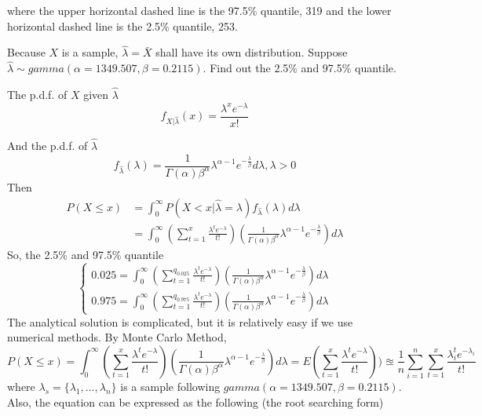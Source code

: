 \documentclass[12pt]{article}
\begin{document}
where the upper horizontal dashed line is the 97.5\% quantile, 319 and
the lower horizontal dashed line is the 2.5\% quantile, 253.

Because \(X\) is a sample, \(\hat{\lambda} = \bar{X}\) shall have its
own distribution. Suppose
\(\hat{\lambda} \sim gamma(\alpha= 1349.507, \beta = 0.2115)\). Find out
the 2.5\% and 97.5\% quantile.

\par

The p.d.f. of \(X\) given \(\hat{\lambda}\) \begin{equation*}
            f_{X|\hat{\lambda}}(x) = \frac{\lambda^{x}e^{-\lambda}}{x!}
    \end{equation*}

\par

And the p.d.f. of \(\hat{\lambda}\) \begin{equation*}
        f_{\hat{\lambda}}(\lambda) = \frac{1}{\Gamma(\alpha)\beta^{\alpha}}\lambda^{\alpha - 1}e^{-\frac{\lambda}{\beta}}d\lambda, \lambda > 0
    \end{equation*} Then \begin{equation*}
        \begin{split}
            P(X \le x) &= \int_{0}^{\infty}P(X < x | \hat{\lambda} = \lambda)f_{\hat{\lambda}}(\lambda) d \lambda \\
            & = \int_{0}^{\infty}(\sum_{t = 1}^{x}\frac{\lambda^{t}e^{-\lambda}}{t!})(\frac{1}{\Gamma(\alpha)\beta^{\alpha}}\lambda^{\alpha - 1}e^{-\frac{\lambda}{\beta}}) d \lambda
        \end{split}
    \end{equation*} So, the 2.5\% and 97.5\% quantile \begin{equation*}
        \begin{cases}
        0.025 = \int_{0}^{\infty}(\sum_{t = 1}^{q_{0.025}}\frac{\lambda^{t}e^{-\lambda}}{t!})(\frac{1}{\Gamma(\alpha)\beta^{\alpha}}\lambda^{\alpha - 1}e^{-\frac{\lambda}{\beta}}) d \lambda \\
        0.975 = \int_{0}^{\infty}(\sum_{t = 1}^{q_{0.975}}\frac{\lambda^{t}e^{-\lambda}}{t!})(\frac{1}{\Gamma(\alpha)\beta^{\alpha}}\lambda^{\alpha - 1}e^{-\frac{\lambda}{\beta}}) d \lambda
        \end{cases}
    \end{equation*} The analytical solution is complicated, but it is
relatively easy if we use numerical methods. By Monte Carlo Method,
\begin{equation*}
        P(X \le x) = \int_{0}^{\infty}(\sum_{t = 1}^{x}\frac{\lambda^{t}e^{-\lambda}}{t!})(\frac{1}{\Gamma(\alpha)\beta^{\alpha}}\lambda^{\alpha - 1}e^{-\frac{\lambda}{\beta}}) d \lambda = E(\sum_{t = 1}^{x}\frac{\lambda^{t}e^{-\lambda}}{t!})) \approxeq \frac{1}{n} \sum_{i = 1}^{n} \sum_{t = 1}^{x}\frac{\lambda_i^{t}e^{-\lambda_i}}{t!}
    \end{equation*} where \(\lambda_s = \{\lambda_1,...,\lambda_n \}\)
is a sample following \(gamma(\alpha= 1349.507, \beta = 0.2115)\). Also,
the equation can be expressed as the following (the root searching form)
\end{document}
